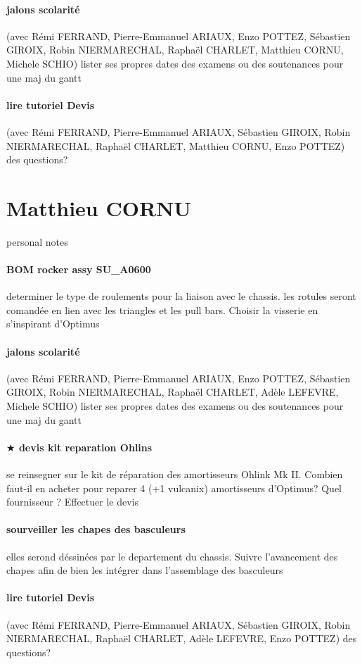 \paragraph{jalons scolarité} (avec Rémi FERRAND, Pierre-Emmanuel ARIAUX, Enzo POTTEZ, Sébastien GIROIX, Robin NIERMARECHAL, Raphaël CHARLET, Matthieu CORNU, Michele SCHIO) lister ses propres dates des examens ou des soutenances pour une maj du gantt
\paragraph{lire tutoriel Devis} (avec Rémi FERRAND, Pierre-Emmanuel ARIAUX, Sébastien GIROIX, Robin NIERMARECHAL, Raphaël CHARLET, Matthieu CORNU, Enzo POTTEZ) des questions?

 
 \newpage \section*{Matthieu CORNU} 
 \par personal notes
\paragraph{BOM rocker assy SU\_A0600} determiner le type de roulements pour la liaison avec le chassis. les rotules seront comandée en lien avec les triangles et les pull bars. Choisir la visserie en s'inspirant d'Optimus
\paragraph{jalons scolarité} (avec Rémi FERRAND, Pierre-Emmanuel ARIAUX, Enzo POTTEZ, Sébastien GIROIX, Robin NIERMARECHAL, Raphaël CHARLET, Adèle LEFEVRE, Michele SCHIO) lister ses propres dates des examens ou des soutenances pour une maj du gantt
\paragraph{$\bigstar$ devis kit reparation Ohlins} se reinsegner sur le kit de réparation des amortisseurs Ohlink Mk II. Combien faut-il en acheter pour reparer 4 (+1 vulcanix) amortisseurs d'Optimus? Quel fournisseur ? Effectuer le devis 
\paragraph{sourveiller les chapes des basculeurs} elles serond déssinées par le departement du chassis. Suivre l'avancement des chapes afin de bien les intégrer dans l'assemblage des basculeurs
\paragraph{lire tutoriel Devis} (avec Rémi FERRAND, Pierre-Emmanuel ARIAUX, Sébastien GIROIX, Robin NIERMARECHAL, Raphaël CHARLET, Adèle LEFEVRE, Enzo POTTEZ) des questions?
